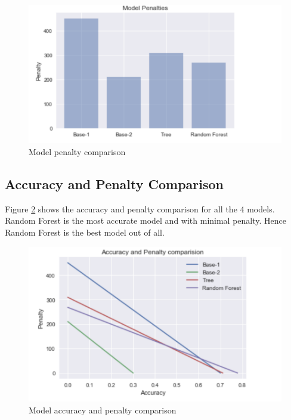 \documentclass[sigconf]{acmart}
\begin{document}
\begin{figure}[htb]
  \centering
  \includegraphics[width=1.0\columnwidth]{images/Figure16.png}
  \caption{Model penalty comparison
  \cite{german-credit-sri-sai}}
  \label{fig:Figure16} 
\end{figure}

\subsection{Accuracy and Penalty Comparison} 

Figure \ref{fig:Figure17} shows the accuracy and penalty comparison for all the 4 models. Random Forest is the most accurate model and with minimal penalty. Hence Random Forest is the best model out of all.

\begin{figure}[htb]
  \centering
  \includegraphics[width=1.0\columnwidth]{images/Figure17.png}
  \caption{Model accuracy and penalty comparison
  \cite{german-credit-sri-sai}}
  \label{fig:Figure17} 
\end{figure}
\end{document}
